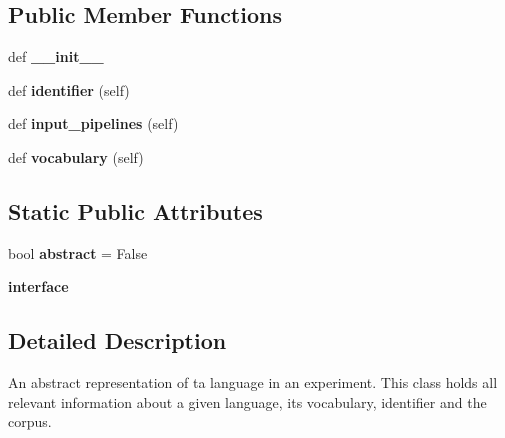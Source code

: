 \subsection*{Public Member Functions}
\begin{DoxyCompactItemize}
\item 
def {\bfseries \+\_\+\+\_\+init\+\_\+\+\_\+}\hypertarget{classreader_1_1Language_a87c8088c36f415a49becda5c8a8f4f4a}{}\label{classreader_1_1Language_a87c8088c36f415a49becda5c8a8f4f4a}

\item 
def {\bfseries identifier} (self)\hypertarget{classreader_1_1Language_a94fbcfc6afd461253b63357051fcd415}{}\label{classreader_1_1Language_a94fbcfc6afd461253b63357051fcd415}

\item 
def {\bfseries input\+\_\+pipelines} (self)\hypertarget{classreader_1_1Language_af63b52231f647db16c3068f059b6b7cf}{}\label{classreader_1_1Language_af63b52231f647db16c3068f059b6b7cf}

\item 
def {\bfseries vocabulary} (self)\hypertarget{classreader_1_1Language_af8ce0fcb143b103f8ed8960ca29aa327}{}\label{classreader_1_1Language_af8ce0fcb143b103f8ed8960ca29aa327}

\end{DoxyCompactItemize}
\subsection*{Static Public Attributes}
\begin{DoxyCompactItemize}
\item 
bool {\bfseries abstract} = False\hypertarget{classreader_1_1Language_ae7b2a09ef605c3ea7317a22928af120d}{}\label{classreader_1_1Language_ae7b2a09ef605c3ea7317a22928af120d}

\item 
{\bfseries interface}
\end{DoxyCompactItemize}


\subsection{Detailed Description}
\begin{DoxyVerb}An abstract representation of ta language in an experiment. This class holds all relevant
information about a given language, its vocabulary, identifier and the corpus.
\end{DoxyVerb}
 


